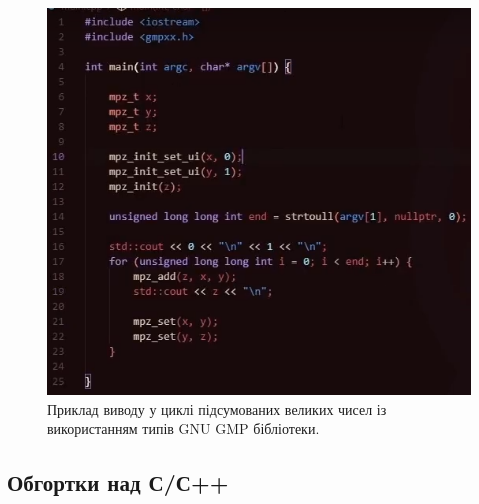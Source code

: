 \begin{itemize}
	\begin{figure}[h]
    		\centering
    		\includegraphics[scale = 0.25]{Images/gnu_gmp}
    		\caption{Приклад виводу у циклі підсумованих великих чисел із використанням  типів GNU GMP бібліотеки.}
    		\label{fig:}
	\end{figure}
\end{itemize}

\subsection{Обгортки над С/С++}

